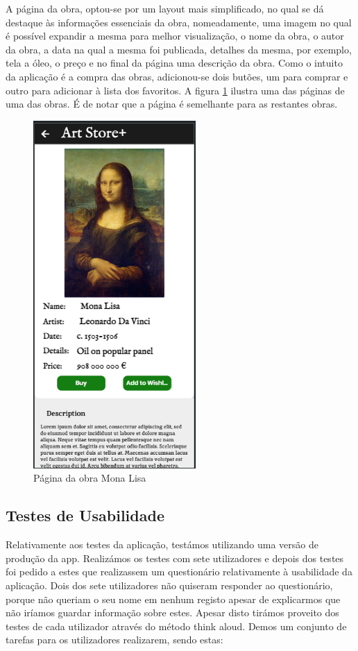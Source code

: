 \documentclass[conference]{IEEEtran}
\begin{document}
A página da obra, optou-se por um layout mais simplificado, no qual se dá destaque às informações 
essenciais da obra, nomeadamente, uma imagem no qual é possível expandir a mesma para melhor visualização, 
o nome da obra, o autor da obra, a data na qual a mesma foi publicada, detalhes da mesma, por exemplo, 
tela a óleo, o preço e no final da página uma descrição da obra. Como o intuito da aplicação é 
a compra das obras, adicionou-se dois butões, um para comprar e outro para adicionar à lista dos favoritos.
A figura \ref{fig:artpiece} ilustra uma das páginas de uma das obras. É de notar que a página 
é semelhante para as restantes obras.

\begin{figure}[h]
    \centering
    \includegraphics[scale=0.4]{artpiecepage-mona-lisa.png}
    \caption{Página da obra Mona Lisa}
    \label{fig:artpiece}
\end{figure}

\subsection{Testes de Usabilidade}

Relativamente aos testes da aplicação, testámos utilizando uma versão de produção da app. 
Realizámos os testes com sete utilizadores e depois dos testes foi pedido a estes que 
realizassem um questionário relativamente à usabilidade da aplicação. 
Dois dos sete utilizadores não quiseram responder ao questionário, 
porque não queriam o seu nome em nenhum registo apesar de explicarmos que 
não iríamos guardar informação sobre estes. Apesar disto tirámos proveito 
dos testes de cada utilizador através do método think aloud. Demos um conjunto de 
tarefas para os utilizadores realizarem, sendo estas:
\end{document}
